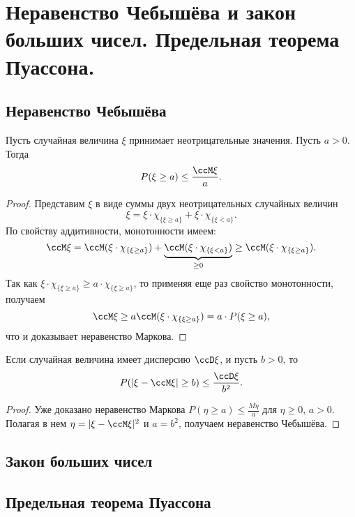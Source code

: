 \chapter{Неравенство Чебышёва и закон больших чисел. Предельная теорема Пуассона.}
\section{Неравенство Чебышёва}
\begin{thm}
Пусть случайная величина $\xi$ принимает неотрицательные значения. Пусть $a>0$. Тогда 
$$
P(\xi \ge a)\le\frac{\ccM\xi}{a}.
$$
\end{thm}
\begin{proof}
Представим $\xi$ в виде суммы двух неотрицательных случайных величин
$$
\xi = \xi\cdot\chi_{\{\xi\ge a\}}+\xi\cdot\chi_{\{\xi< a\}}.
$$
По свойству аддитивности, монотонности имеем:
$$
\ccM\xi=\ccM(\xi\cdot\chi_{\{\xi\ge a\}})+\underbrace{\ccM(\xi\cdot\chi_{\{\xi< a\}})}_{\ge 0} \ge \ccM(\xi\cdot\chi_{\{\xi\ge a\}}).
$$
Так как $\xi\cdot\chi_{\{\xi\ge a\}}\ge a\cdot\chi_{\{\xi\ge a\}}$, то применяя еще раз свойство монотонности, получаем
$$
\ccM\xi\ge a\ccM(\xi\cdot\chi_{\{\xi\ge a\}})=a\cdot P(\xi\ge a),
$$
что и доказывает неравенство Маркова.
\end{proof}

\begin{thm}
Если случайная величина имеет дисперсию $\ccD\xi$, и пусть $b>0$, то
$$
P(|\xi-\ccM\xi|\ge b ) \le\frac{\ccD\xi}{b^2}.
$$
\end{thm} 
\begin{proof}
Уже доказано неравенство Маркова $P(\eta \ge a) \le \frac{M\eta}{a}$  для $\eta \ge 0$, $a>0$. Полагая в нем $\eta = |\xi-\ccM\xi|^2$ и $a=b^2$, получаем неравенство Чебышёва.
\end{proof}

\section{Закон больших чисел}


\section{Предельная теорема Пуассона}